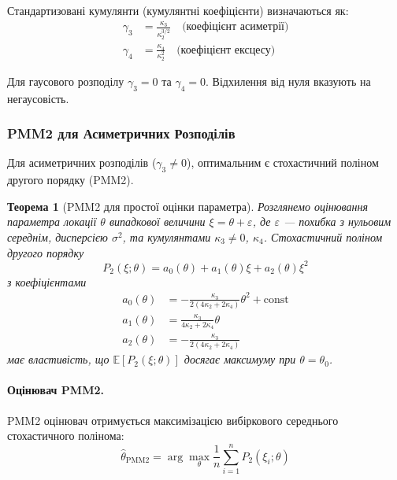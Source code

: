 \documentclass[12pt,a4paper]{article}
\newtheorem{theorem}{Теорема}[section]
\begin{document}
Стандартизовані кумулянти (кумулянтні коефіцієнти) визначаються як:
\begin{align}
\gamma_3 &= \frac{\kappa_3}{\kappa_2^{3/2}} \quad \text{(коефіцієнт асиметрії)} \label{eq:skewness} \\
\gamma_4 &= \frac{\kappa_4}{\kappa_2^{2}} \quad \text{(коефіцієнт ексцесу)} \label{eq:kurtosis}
\end{align}

Для гаусового розподілу $\gamma_3 = 0$ та $\gamma_4 = 0$. Відхилення від нуля вказують на негаусовість.

\subsubsection{PMM2 для Асиметричних Розподілів}

Для асиметричних розподілів ($\gamma_3 \neq 0$), оптимальним є стохастичний поліном другого порядку (PMM2).

\begin{theorem}[PMM2 для простої оцінки параметра]
\label{thm:pmm2_basic}
Розглянемо оцінювання параметра локації $\theta$ випадкової величини $\xi = \theta + \varepsilon$, де $\varepsilon$ --- похибка з нульовим середнім, дисперсією $\sigma^2$, та кумулянтами $\kappa_3 \neq 0$, $\kappa_4$. Стохастичний поліном другого порядку
\begin{equation}
\label{eq:pmm2_polynomial}
P_2(\xi; \theta) = a_0(\theta) + a_1(\theta) \xi + a_2(\theta) \xi^2
\end{equation}
з коефіцієнтами
\begin{align}
a_0(\theta) &= -\frac{\kappa_3}{2(4\kappa_2 + 2\kappa_4)} \theta^2 + \text{const} \label{eq:a0} \\
a_1(\theta) &= \frac{\kappa_3}{4\kappa_2 + 2\kappa_4} \theta \label{eq:a1} \\
a_2(\theta) &= -\frac{\kappa_3}{2(4\kappa_2 + 2\kappa_4)} \label{eq:a2}
\end{align}
має властивість, що $\mathbb{E}[P_2(\xi; \theta)]$ досягає максимуму при $\theta = \theta_0$.
\end{theorem}

\paragraph{Оцінювач PMM2.}

PMM2 оцінювач отримується максимізацією вибіркового середнього стохастичного полінома:
\begin{equation}
\label{eq:pmm2_estimator}
\hat{\theta}_{\text{PMM2}} = \arg\max_{\theta} \frac{1}{n} \sum_{i=1}^{n} P_2(\xi_i; \theta)
\end{equation}
\end{document}

